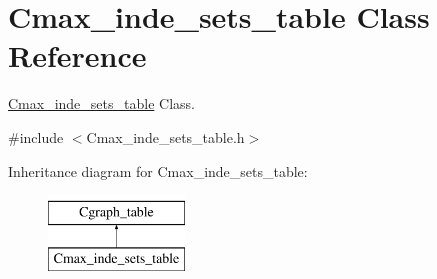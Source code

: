 \hypertarget{class_cmax__inde__sets__table}{}\section{Cmax\+\_\+inde\+\_\+sets\+\_\+table Class Reference}
\label{class_cmax__inde__sets__table}


\hyperlink{class_cmax__inde__sets__table}{Cmax\+\_\+inde\+\_\+sets\+\_\+table} Class.  




{\ttfamily \#include $<$Cmax\+\_\+inde\+\_\+sets\+\_\+table.\+h$>$}

Inheritance diagram for Cmax\+\_\+inde\+\_\+sets\+\_\+table\+:\begin{figure}[H]
\begin{center}
\leavevmode
\includegraphics[height=2.000000cm]{class_cmax__inde__sets__table}
\end{center}
\end{figure}
